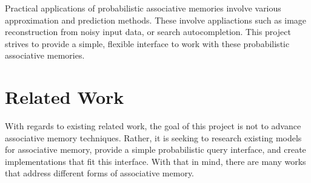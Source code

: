 \documentclass{sig-alternate}
\begin{document}
Practical applications of probabilistic associative memories involve various approximation and prediction methods.
These involve appliactions such as image reconstruction from noisy input data, or search autocompletion.
This project strives to provide a simple, flexible interface to work with these probabilistic associative memories.


%


\section{Related Work}
\label{sec:related_work}

With regards to existing related work, the goal of this project is not to advance associative memory techniques.
Rather, it is seeking to research existing models for associative memory, provide a simple probabilistic query interface, and create 
implementations that fit this interface. With that in mind, there are many works that address different forms of associative memory. 
\end{document}

